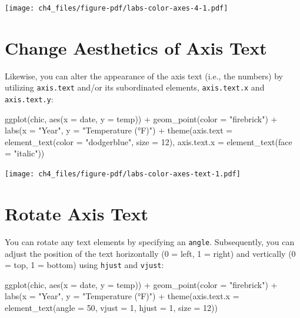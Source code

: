 \documentclass[
  letterpaper,
  DIV=11,
  numbers=noendperiod]{scrreprt}
\newenvironment{Shaded}{\begin{snugshade}}{\end{snugshade}}
\newcommand{\AttributeTok}[1]{\textcolor[rgb]{0.40,0.45,0.13}{#1}}
\newcommand{\DecValTok}[1]{\textcolor[rgb]{0.68,0.00,0.00}{#1}}
\newcommand{\FunctionTok}[1]{\textcolor[rgb]{0.28,0.35,0.67}{#1}}
\newcommand{\NormalTok}[1]{\textcolor[rgb]{0.00,0.23,0.31}{#1}}
\newcommand{\SpecialCharTok}[1]{\textcolor[rgb]{0.37,0.37,0.37}{#1}}
\newcommand{\StringTok}[1]{\textcolor[rgb]{0.13,0.47,0.30}{#1}}
\begin{document}
\texttt{[image: ch4\_files/figure-pdf/labs-color-axes-4-1.pdf]}

\section{Change Aesthetics of Axis
Text}\label{change-aesthetics-of-axis-text}

Likewise, you can alter the appearance of the axis text (i.e., the
numbers) by utilizing \texttt{axis.text} and/or its subordinated
elements, \texttt{axis.text.x} and \texttt{axis.text.y}:

\begin{Shaded}
\begin{Highlighting}[]
\FunctionTok{ggplot}\NormalTok{(chic, }\FunctionTok{aes}\NormalTok{(}\AttributeTok{x =}\NormalTok{ date, }\AttributeTok{y =}\NormalTok{ temp)) }\SpecialCharTok{+}
  \FunctionTok{geom\_point}\NormalTok{(}\AttributeTok{color =} \StringTok{"firebrick"}\NormalTok{) }\SpecialCharTok{+}
  \FunctionTok{labs}\NormalTok{(}\AttributeTok{x =} \StringTok{"Year"}\NormalTok{, }\AttributeTok{y =} \StringTok{"Temperature (°F)"}\NormalTok{) }\SpecialCharTok{+}
  \FunctionTok{theme}\NormalTok{(}\AttributeTok{axis.text =} \FunctionTok{element\_text}\NormalTok{(}\AttributeTok{color =} \StringTok{"dodgerblue"}\NormalTok{, }\AttributeTok{size =} \DecValTok{12}\NormalTok{),}
        \AttributeTok{axis.text.x =} \FunctionTok{element\_text}\NormalTok{(}\AttributeTok{face =} \StringTok{"italic"}\NormalTok{))}
\end{Highlighting}
\end{Shaded}

\texttt{[image: ch4\_files/figure-pdf/labs-color-axes-text-1.pdf]}

\section{Rotate Axis Text}\label{rotate-axis-text}

You can rotate any text elements by specifying an \texttt{angle}.
Subsequently, you can adjust the position of the text horizontally (0 =
left, 1 = right) and vertically (0 = top, 1 = bottom) using
\texttt{hjust} and \texttt{vjust}:

\begin{Shaded}
\begin{Highlighting}[]
\FunctionTok{ggplot}\NormalTok{(chic, }\FunctionTok{aes}\NormalTok{(}\AttributeTok{x =}\NormalTok{ date, }\AttributeTok{y =}\NormalTok{ temp)) }\SpecialCharTok{+}
  \FunctionTok{geom\_point}\NormalTok{(}\AttributeTok{color =} \StringTok{"firebrick"}\NormalTok{) }\SpecialCharTok{+}
  \FunctionTok{labs}\NormalTok{(}\AttributeTok{x =} \StringTok{"Year"}\NormalTok{, }\AttributeTok{y =} \StringTok{"Temperature (°F)"}\NormalTok{) }\SpecialCharTok{+}
  \FunctionTok{theme}\NormalTok{(}\AttributeTok{axis.text.x =} \FunctionTok{element\_text}\NormalTok{(}\AttributeTok{angle =} \DecValTok{50}\NormalTok{, }\AttributeTok{vjust =} \DecValTok{1}\NormalTok{, }\AttributeTok{hjust =} \DecValTok{1}\NormalTok{, }\AttributeTok{size =} \DecValTok{12}\NormalTok{))}
\end{Highlighting}
\end{Shaded}
\end{document}

